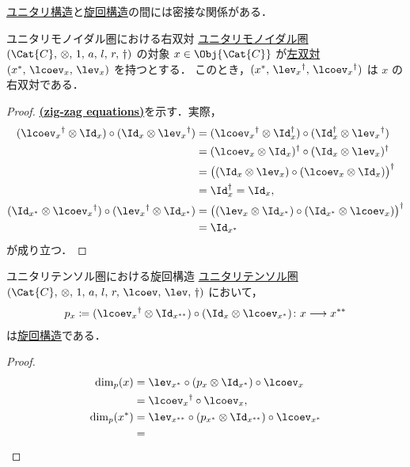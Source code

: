 \documentclass[TQFT_main]{subfiles}
\begin{document}
\hyperref[def:unitary-monoidal]{ユニタリ構造}と\hyperref[def:pivotal]{旋回構造}の間には密接な関係がある．

\begin{mylem}[label=lem:rdual-unitary]{ユニタリモノイダル圏における右双対}
    \hyperref[def:unitary-monoidal]{ユニタリモノイダル圏} $(\Cat{C},\, \otimes,\, 1,\, a,\, l,\, r,\, \dagger)$ の対象 $x \in \Obj{\Cat{C}}$ が\hyperref[def:dual]{左双対} $(x^*,\, \lcoev_x,\, \lev_x)$ を持つとする．
    このとき，$(x^*,\, \lev_x{}^\dagger,\, \lcoev_x{}^\dagger)$ は $x$ の右双対である．
\end{mylem}

\begin{proof}
    \hyperref[def:dual]{\textsf{\textbf{(zig-zag equations)}}}を示す．実際，
    \begin{align}
        (\lcoev_x{}^\dagger \otimes \Id_x) \circ (\Id_x \otimes \lev_x{}^\dagger)
        &= (\lcoev_x{}^\dagger \otimes \Id_x^\dagger) \circ (\Id_x^\dagger \otimes \lev_x{}^\dagger) \\
        &= (\lcoev_x \otimes \Id_x)^\dagger \circ (\Id_x \otimes \lev_x)^\dagger \\
        &= \bigl( (\Id_x \otimes \lev_x) \circ (\lcoev_x \otimes \Id_x)\bigr)^\dagger \\
        &= \Id_x^\dagger = \Id_x, \\
        (\Id_{x^*} \otimes \lcoev_x{}^\dagger) \circ (\lev_x{}^\dagger \otimes \Id_{x^*})
        &= \bigl( (\lev_x\otimes \Id_{x^*}) \circ (\Id_{x^*} \otimes \lcoev_x) \bigr)^\dagger \\
        &= \Id_{x^*}
    \end{align}
    が成り立つ．
\end{proof}

\begin{mylem}[label=lem:spherical-unitary]{ユニタリテンソル圏における旋回構造}
    \hyperref[def:unitary-monoidal]{ユニタリ}\hyperref[def:tensorfusion-cat]{テンソル圏} $(\Cat{C},\, \otimes,\, 1,\, a,\, l,\, r,\, \lcoev,\, \lev,\, \dagger)$ において，
    \begin{align}
        p_x \coloneqq (\lcoev_x{}^\dagger \otimes \Id_{x^{**}}) \circ (\Id_x \otimes \lcoev_{x^*}) \colon x \lto x^{**}
    \end{align}
    は\hyperref[def:pivotal]{旋回構造}である．
\end{mylem}

\begin{proof}
    \begin{align}
        \dim_p(x)
        &= \lev_{x^*} \circ (p_x \otimes \Id_{x^*}) \circ \lcoev_x \\
        &= \lcoev_x{}^\dagger \circ \lcoev_x, \\
        \dim_p(x^*)
        &= \lev_{x^{**}} \circ (p_{x^*} \otimes \Id_{x^{**}}) \circ \lcoev_{x^*} \\
        &= 
    \end{align}
    
\end{proof}
\end{document}
